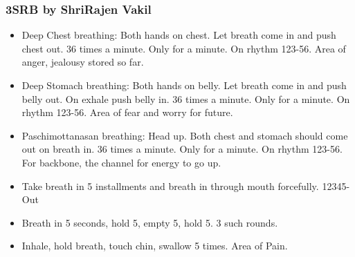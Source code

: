 \begin{frame}[fragile]
\frametitle{3SRB by ShriRajen Vakil}


\begin{itemize}
\item Deep Chest breathing: Both hands on chest. Let breath come in and push chest out. 36 times a minute. Only for a minute. On rhythm 123-56. Area of anger, jealousy stored so far.
\item Deep Stomach breathing: Both hands on belly. Let breath come in and push belly out. On exhale push belly in. 36 times a minute. Only for a minute. On rhythm 123-56. Area of fear and worry for future.
\item Paschimottanasan breathing: Head up. Both chest and stomach should come out on breath in. 36 times a minute. Only for a minute. On rhythm 123-56. For backbone, the channel for energy to go up.
\item Take breath in 5 installments and breath in through mouth forcefully. 12345-Out
\item Breath in 5 seconds, hold 5, empty 5, hold 5. 3 such rounds.
\item Inhale, hold breath, touch chin, swallow 5 times. Area of Pain.

\end{itemize}
\end{frame}
